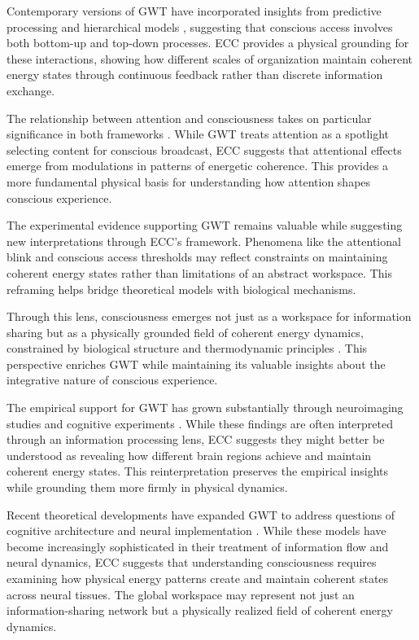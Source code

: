 Contemporary versions of GWT have incorporated insights from predictive processing and hierarchical models \cite{Dehaene2011}, suggesting that conscious access involves both bottom-up and top-down processes. ECC provides a physical grounding for these interactions, showing how different scales of organization maintain coherent energy states through continuous feedback rather than discrete information exchange.

The relationship between attention and consciousness takes on particular significance in both frameworks \cite{Baars2013}. While GWT treats attention as a spotlight selecting content for conscious broadcast, ECC suggests that attentional effects emerge from modulations in patterns of energetic coherence. This provides a more fundamental physical basis for understanding how attention shapes conscious experience.

The experimental evidence supporting GWT \cite{Sergent2004} remains valuable while suggesting new interpretations through ECC's framework. Phenomena like the attentional blink and conscious access thresholds may reflect constraints on maintaining coherent energy states rather than limitations of an abstract workspace. This reframing helps bridge theoretical models with biological mechanisms.

Through this lens, consciousness emerges not just as a workspace for information sharing but as a physically grounded field of coherent energy dynamics, constrained by biological structure and thermodynamic principles \cite{Dehaene2001}. This perspective enriches GWT while maintaining its valuable insights about the integrative nature of conscious experience.

The empirical support for GWT has grown substantially through neuroimaging studies and cognitive experiments \cite{Dehaene2006}. While these findings are often interpreted through an information processing lens, ECC suggests they might better be understood as revealing how different brain regions achieve and maintain coherent energy states. This reinterpretation preserves the empirical insights while grounding them more firmly in physical dynamics.

Recent theoretical developments have expanded GWT to address questions of cognitive architecture and neural implementation \cite{Mashour2020}. While these models have become increasingly sophisticated in their treatment of information flow and neural dynamics, ECC suggests that understanding consciousness requires examining how physical energy patterns create and maintain coherent states across neural tissues. The global workspace may represent not just an information-sharing network but a physically realized field of coherent energy dynamics.

